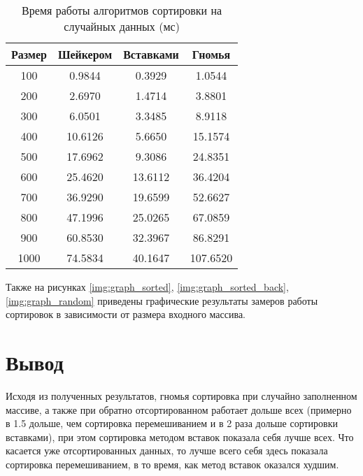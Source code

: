 \begin{table}[h]
	\begin{center}
		\caption{Время работы алгоритмов сортировки на случайных данных (мс)}
		\label{tbl:random}
		\begin{tabular}{|c|c|c|c|}
			\hline
			 Размер & Шейкером &  Вставками &  Гномья \\
			\hline
			100 & 0.9844 & 0.3929 & 1.0544 \\ 
			\hline
			200 & 2.6970 & 1.4714 & 3.8801 \\ 
			\hline
			300 & 6.0501 & 3.3485 & 8.9118 \\ 
			\hline
			400 & 10.6126 & 5.6650 & 15.1574 \\ 
			\hline
			500 & 17.6962 & 9.3086 & 24.8351 \\ 
			\hline
			600 & 25.4620 & 13.6112 & 36.4204 \\ 
			\hline
			700 & 36.9290 & 19.6599 & 52.6627 \\ 
			\hline
			800 & 47.1996 & 25.0265 & 67.0859 \\ 
			\hline
			900 & 60.8530 & 32.3967 & 86.8291 \\ 
			\hline
			1000 & 74.5834 & 40.1647 & 107.6520 \\ 
			\hline
		\end{tabular}
    \end{center}
\end{table}


Также на рисунках \ref{img:graph_sorted}, \ref{img:graph_sorted_back}, \ref{img:graph_random} приведены графические результаты замеров работы сортировок в зависимости от размера входного массива.


\clearpage

\section*{Вывод}
Исходя из полученных результатов, гномья сортировка при случайно заполненном массиве, а также при обратно отсортированном работает дольше всех (примерно в 1.5 дольше, чем сортировка перемешиванием и в 2 раза дольше сортировки вставками), при этом сортировка методом вставок показала себя лучше всех. Что касается уже отсортированных данных, то лучше всего себя здесь показала сортировка перемешиванием, в то время, как метод вставок оказался худшим.